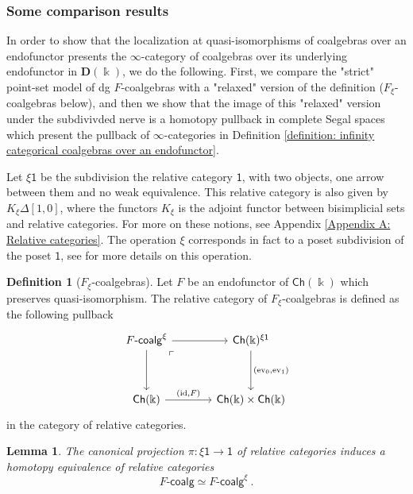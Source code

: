 \documentclass[a4paper,12pt]{amsart}
\theoremstyle{plain}
\newtheorem{lemma}[theorem]{Lemma}%
\theoremstyle{definition}
\newtheorem{definition}[theorem]{Definition}%
\theoremstyle{remark}
\newcommand{\kk}{\Bbbk}
\begin{document}
\subsubsection{Some comparison results} In order to show that the localization at quasi-isomorphisms of coalgebras over an endofunctor presents the $\infty$-category of coalgebras over its underlying endofunctor in $\mathbf{D}(\kk)$, we do the following. First, we compare the "strict" point-set model of dg $F$-coalgebras with a "relaxed" version of the definition ($F_\xi$-coalgebras below), and then we show that the image of this "relaxed" version under the subdivivded nerve is a homotopy pullback in complete Segal spaces which present the pullback of $\infty$-categories in Definition \ref{definition: infinity categorical coalgebras over an endofunctor}.


\usetikzlibrary{arrows,decorations.pathmorphing,backgrounds,positioning,fit,petri,calc,intersections}

Let $\xi\mathsf{1}$ be the subdivision the relative category $\mathsf{1}$, with two objects, one arrow between them and no weak equivalence. This relative category is also given by $K_{\xi}\Delta[1,0]$, where the functors $K_{\xi}$ is the adjoint functor between bisimplicial sets and relative categories. For more on these notions, see Appendix \ref{Appendix A: Relative categories}. The operation $\xi$ corresponds in fact to a poset subdivision of the poset $\mathsf{1}$, see \cite[Section 4]{BarwickKan1} for more details on this operation. 

\begin{definition}[$F_\xi$-coalgebras]
Let $F$ be an endofunctor of $\mathsf{Ch}(\kk)$ which preserves quasi-isomorphism. The relative category of $F_\xi$-coalgebras is defined as the following pullback 
\[
\begin{tikzcd}[column sep=3pc,row sep=3pc]
F\text{-}\mathsf{coalg}^{\xi} \arrow[r] \arrow[d] \arrow[dr, phantom, "\ulcorner", very near start]
& \mathsf{Ch}(\kk)^{\xi\mathsf{1}} \arrow[d,"{(\mathrm{ev}_0,\mathrm{ev}_1)}"]  \\
 \mathsf{Ch}(\kk) \arrow[r,"{(\mathrm{id},F)}"]
& \mathsf{Ch}(\kk) \times  \mathsf{Ch}(\kk)
\end{tikzcd}
\]
in the category of relative categories. 
\end{definition}

\begin{lemma}\label{lemma: xi-coalgebras}
The canonical projection $\pi: \xi\mathsf{1} \longrightarrow \mathsf{1}$ of relative categories induces a homotopy equivalence of relative categories
\[
F\text{-}\mathsf{coalg}\simeq F\text{-}\mathsf{coalg}^{\xi}~. 
\]
\end{lemma}
\end{document}
